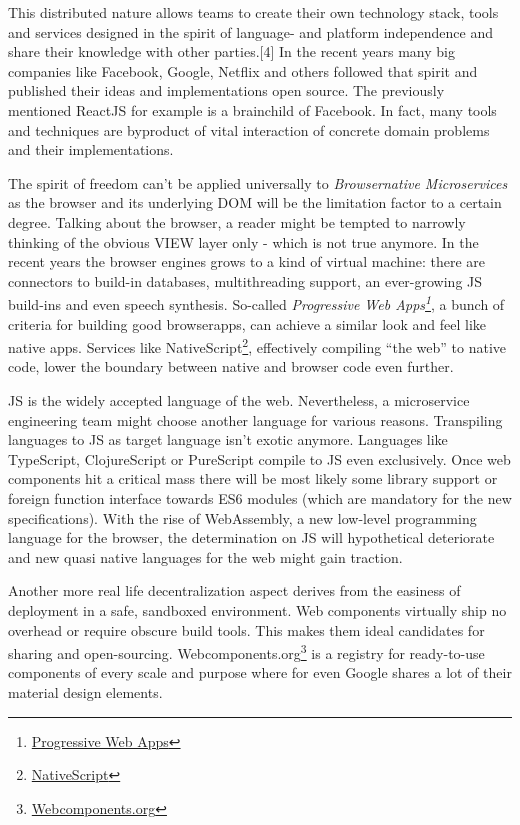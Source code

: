 \documentclass[]{article}
\begin{document}
This distributed nature allows teams to create their own technology
stack, tools and services designed in the spirit of language- and
platform independence and share their knowledge with other
parties.{[}4{]} In the recent years many big companies like Facebook,
Google, Netflix and others followed that spirit and published their
ideas and implementations open source. The previously mentioned ReactJS
for example is a brainchild of Facebook. In fact, many tools and
techniques are byproduct of vital interaction of concrete domain
problems and their implementations.

The spirit of freedom can't be applied universally to
\emph{Browsernative Microservices} as the browser and its underlying DOM
will be the limitation factor to a certain degree. Talking about the
browser, a reader might be tempted to narrowly thinking of the obvious
VIEW layer only - which is not true anymore. In the recent years the
browser engines grows to a kind of virtual machine: there are connectors
to build-in databases, multithreading support, an ever-growing JS
build-ins and even speech synthesis. So-called \emph{Progressive Web
Apps\footnote{\href{https://developers.google.com/web/progressive-web-apps}{Progressive
  Web Apps}}}, a bunch of criteria for building good browserapps, can
achieve a similar look and feel like native apps. Services like
NativeScript\footnote{\href{https://www.nativescript.org}{NativeScript}},
effectively compiling ``the web'' to native code, lower the boundary
between native and browser code even further.

JS is the widely accepted language of the web. Nevertheless, a
microservice engineering team might choose another language for various
reasons. Transpiling languages to JS as target language isn't exotic
anymore. Languages like TypeScript, ClojureScript or PureScript compile
to JS even exclusively. Once web components hit a critical mass there
will be most likely some library support or foreign function interface
towards ES6 modules (which are mandatory for the new specifications).
With the rise of WebAssembly, a new low-level programming language for
the browser, the determination on JS will hypothetical deteriorate and
new quasi native languages for the web might gain traction.

Another more real life decentralization aspect derives from the easiness
of deployment in a safe, sandboxed environment. Web components virtually
ship no overhead or require obscure build tools. This makes them ideal
candidates for sharing and open-sourcing. Webcomponents.org\footnote{\href{https://webcomponents.org}{Webcomponents.org}}
is a registry for ready-to-use components of every scale and purpose
where for even Google shares a lot of their material design elements.
\end{document}

